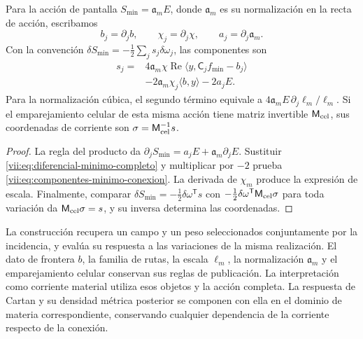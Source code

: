\begin{theorem}
\label{vii:thm:componentes-minimo-conexion}
Para la acción de pantalla
\(S_{\min}=\mathfrak a_m E\), donde \(\mathfrak a_m\) es su
normalización en la recta de acción, escribamos
\[
 b_j=\partial_jb,\qquad \chi_j=\partial_j\chi,
 \qquad a_j=\partial_j\mathfrak a_m.
\]
Con la convención \(\delta S_{\min}=-\tfrac12\sum_j s_j\delta\omega_j\),
las componentes son
\begin{equation}
 \begin{split}
 s_j={}&4\mathfrak a_m\chi\operatorname{Re}
             \langle y,\mathsf C_jf_{\min}-b_j\rangle\\
      &-2\mathfrak a_m\chi_j\langle b,y\rangle-2a_jE.
 \end{split}
 \label{vii:eq:componentes-minimo-conexion}
\end{equation}
Para la normalización cúbica, el segundo término equivale a
\(4\mathfrak a_m E\,\partial_j\ell_m/\ell_m\).
Si el emparejamiento celular de esta misma acción tiene matriz
invertible \(\mathsf M_{\rm cel}\), sus coordenadas de corriente
son \(\sigma=\mathsf M_{\rm cel}^{-1}s\).
\end{theorem}

\begin{proof}
La regla del producto da
\(\partial_jS_{\min}=a_jE+\mathfrak a_m\partial_jE\).
Sustituir \eqref{vii:eq:diferencial-minimo-completo} y multiplicar
por \(-2\) prueba \eqref{vii:eq:componentes-minimo-conexion}.
La derivada de \(\chi_m\) produce la expresión de escala.
Finalmente, comparar
\(\delta S_{\min}=-\tfrac12\delta\omega^{\mathsf T}s\)
con \(-\tfrac12\delta\omega^{\mathsf T}\mathsf M_{\rm cel}\sigma\)
para toda variación da \(\mathsf M_{\rm cel}\sigma=s\),
y su inversa determina las coordenadas.
\end{proof}

La construcción recupera un campo y un peso seleccionados conjuntamente
por la incidencia, y evalúa su respuesta a las variaciones de la misma
realización. El dato de frontera \(b\), la familia de rutas, la escala
\(\ell_m\), la normalización \(\mathfrak a_m\) y el emparejamiento
celular conservan sus reglas de publicación. La interpretación como
corriente material utiliza esos objetos y la acción completa. La
respuesta de Cartan y su densidad métrica posterior se componen con
ella en el dominio de materia correspondiente, conservando cualquier
dependencia de la corriente respecto de la conexión.
